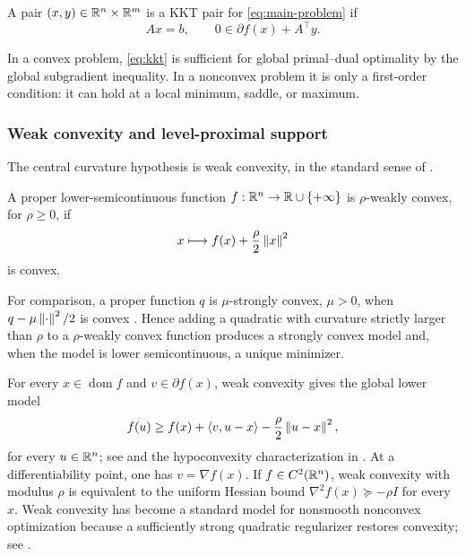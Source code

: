 \begin{definition}
  A pair \((x,y)\in\mathbb{R}^n\times\mathbb{R}^m\) is a KKT pair for
  \cref{eq:main-problem} if
  \begin{equation}
    Ax=b,
    \qquad
    0\in\partial f(x)+A^\top y .
    \label{eq:kkt}
  \end{equation}
\end{definition}

In a convex problem, \cref{eq:kkt} is sufficient for global primal--dual
optimality by the global subgradient inequality.  In a nonconvex
problem it is only a first-order condition: it can hold at a local minimum,
saddle, or maximum.

\subsubsection{Weak convexity and level-proximal support}

The central curvature hypothesis is weak convexity, in the standard sense of
\citet[Section~2]{DavisDrusvyatskiy2019}.

\begin{definition}
  A proper lower-semicontinuous function \(f:\mathbb{R}^n\to\mathbb{R}\cup\{+\infty\}\) is
  \(\rho\)-weakly convex, for \(\rho\ge0\), if
  \[
    x\longmapsto f(x)+\frac{\rho}{2}\left\lVert x\right\rVert^2
  \]
  is convex.
\end{definition}

For comparison, a proper function \(q\) is \(\mu\)-strongly convex,
\(\mu>0\), when
\(q-\mu\left\lVert \cdot\right\rVert^{2}/2\) is convex
\citep[Exercise~12.59]{RockafellarWets1998}.  Hence adding a quadratic with
curvature strictly larger than \(\rho\) to a \(\rho\)-weakly convex function
produces a strongly convex model and, when the model is lower
semicontinuous, a unique minimizer.

For every \(x\in\operatorname{dom}f\) and \(v\in\partial f(x)\), weak
convexity gives the global lower model
\begin{equation}
  f(u)\ge f(x)+\left\langle v,u-x\right\rangle
          -\frac{\rho}{2}\left\lVert u-x\right\rVert^2 ,
  \label{eq:weak-convex-lower}
\end{equation}
for every \(u\in\mathbb{R}^n\); see
\citet[Lemma~2.1]{DavisDrusvyatskiy2019} and the hypoconvexity
characterization in
\citet[Exercise~12.61]{RockafellarWets1998}.  At a differentiability point,
one has \(v=\nabla f(x)\).  If \(f\in C^2(\mathbb{R}^n)\), weak convexity with modulus
\(\rho\) is equivalent to the uniform Hessian bound
\(\nabla^2 f(x)\succeq-\rho I\) for every \(x\).
Weak convexity has become a standard model for nonsmooth nonconvex
optimization because a sufficiently strong quadratic regularizer restores
convexity; see \citet{DavisDrusvyatskiy2019}.

